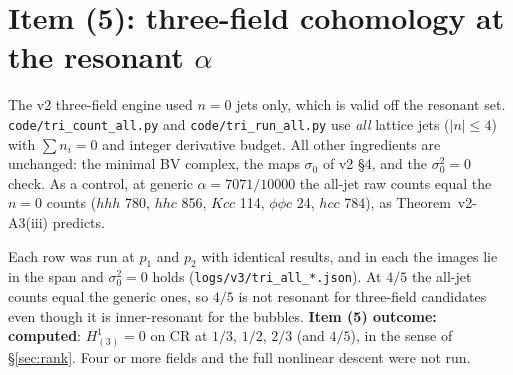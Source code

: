\section{Item (5): three-field cohomology at the resonant \texorpdfstring{$\alpha$}{alpha}}\label{sec:tri}
The v2 three-field engine used $n=0$ jets only, which is valid off the resonant set. \texttt{code/tri\_count\_all.py} and \texttt{code/tri\_run\_all.py} use \emph{all} lattice jets ($|n|\le4$) with $\sum n_i=0$ and integer derivative budget. All other ingredients are unchanged: the minimal BV complex, the maps $\sigma_0$ of v2 \S4, and the $\sigma_0^2=0$ check. As a control, at generic $\alpha=7071/10000$ the all-jet raw counts equal the $n=0$ counts ($hhh$ 780, $hhc$ 856, $Kcc$ 114, $\phi\phi c$ 24, $hcc$ 784), as Theorem~v2-A3(iii) predicts.
\begin{center}\end{center}
Each row was run at $p_1$ and $p_2$ with identical results, and in each the images lie in the span and $\sigma_0^2=0$ holds (\texttt{logs/v3/tri\_all\_*.json}). At $4/5$ the all-jet counts equal the generic ones, so $4/5$ is not resonant for three-field candidates even though it is inner-resonant for the bubbles. \textbf{Item (5) outcome: computed}: $H^1_{(3)}=0$ on CR at $1/3$, $1/2$, $2/3$ (and $4/5$), in the sense of \S\ref{sec:rank}. Four or more fields and the full nonlinear descent were not run.


